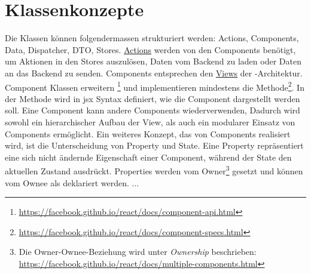 \section{Klassenkonzepte}
\label{pd-klassenkonzepte}
Die Klassen können folgendermassen strukturiert werden: Actions, Components, Data, Dispatcher, DTO, Stores.\newline
\newline
\hyperref[pd-flux-actions]{Actions} werden von den Components benötigt, um Aktionen in den Stores auszulösen, Daten vom \gls{Backend} zu laden oder Daten an das \gls{Backend} zu senden.\newline
\newline
Components entsprechen den \hyperref[pd-flux-views]{Views} der -Architektur.
Component Klassen erweitern \footnote{\url{https://facebook.github.io/react/docs/component-api.html}} und implementieren mindestens die  Methode\footnote{\url{https://facebook.github.io/react/docs/component-specs.html}}. 
In der  Methode wird in \gls{jsx} Syntax definiert, wie die Component dargestellt werden soll.\newline
Eine Component kann andere Components wiederverwenden,
Dadurch wird sowohl ein hierarchischer Aufbau der View, als auch ein modularer Einsatz von Components  ermöglicht.\newline
Ein weiteres Konzept, das von Components realisiert wird, ist die Unterscheidung von Property und State.
Eine Property repräsentiert eine sich nicht ändernde Eigenschaft einer Component, während der State den aktuellen Zustand ausdrückt.
Properties werden vom Owner\footnote{Die Owner-Ownee-Beziehung wird unter \emph{Ownership} beschrieben: \url{https://facebook.github.io/react/docs/multiple-components.html}} gesetzt und können vom Ownee als  deklariert werden.
...